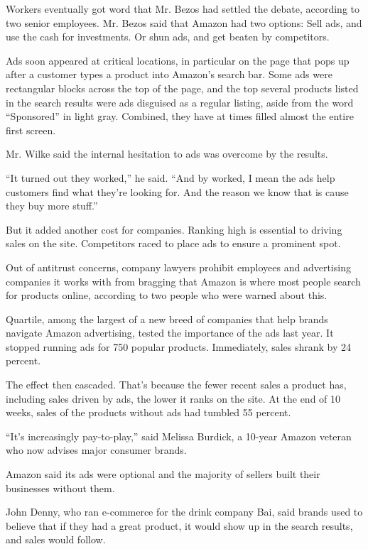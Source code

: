 Workers eventually got word that Mr. Bezos had settled the debate,
according to two senior employees. Mr. Bezos said that Amazon had two
options: Sell ads, and use the cash for investments. Or shun ads, and
get beaten by competitors.

Ads soon appeared at critical locations, in particular on the page that
pops up after a customer types a product into Amazon's search bar. Some
ads were rectangular blocks across the top of the page, and the top
several products listed in the search results were ads disguised as a
regular listing, aside from the word ``Sponsored'' in light gray.
Combined, they have at times filled almost the entire first screen.

Mr. Wilke said the internal hesitation to ads was overcome by the
results.

``It turned out they worked,'' he said. ``And by worked, I mean the ads
help customers find what they're looking for. And the reason we know
that is cause they buy more stuff.''

But it added another cost for companies. Ranking high is essential to
driving sales on the site. Competitors raced to place ads to ensure a
prominent spot.

Out of antitrust concerns, company lawyers prohibit employees and
advertising companies it works with from bragging that Amazon is where
most people search for products online, according to two people who were
warned about this.

Quartile, among the largest of a new breed of companies that help brands
navigate Amazon advertising, tested the importance of the ads last year.
It stopped running ads for 750 popular products. Immediately, sales
shrank by 24 percent.

The effect then cascaded. That's because the fewer recent sales a
product has, including sales driven by ads, the lower it ranks on the
site. At the end of 10 weeks, sales of the products without ads had
tumbled 55 percent.

``It's increasingly pay-to-play,'' said Melissa Burdick, a 10-year
Amazon veteran who now advises major consumer brands.

Amazon said its ads were optional and the majority of sellers built
their businesses without them.

John Denny, who ran e-commerce for the drink company Bai, said brands
used to believe that if they had a great product, it would show up in
the search results, and sales would follow.


